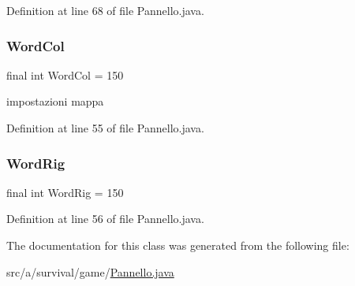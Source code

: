 Definition at line 68 of file Pannello.\+java.

\mbox{\label{classa_1_1survival_1_1game_1_1_pannello_ae2957af001a1ecbc4831d6eddcecb539}} 
\subsubsection{\texorpdfstring{Word\+Col}{WordCol}}
{\footnotesize\ttfamily final int Word\+Col = 150}

impostazioni mappa 

Definition at line 55 of file Pannello.\+java.

\mbox{\label{classa_1_1survival_1_1game_1_1_pannello_a1b6b63331c98b61b838b1834813d57cb}} 
\subsubsection{\texorpdfstring{Word\+Rig}{WordRig}}
{\footnotesize\ttfamily final int Word\+Rig = 150}



Definition at line 56 of file Pannello.\+java.



The documentation for this class was generated from the following file\+:\begin{DoxyCompactItemize}
\item 
src/a/survival/game/\hyperlink{_pannello_8java}{Pannello.\+java}\end{DoxyCompactItemize}
